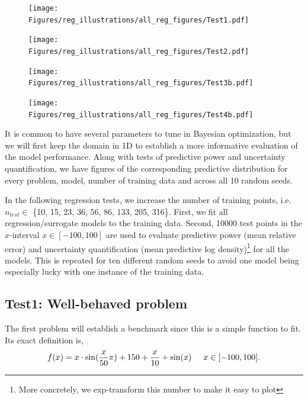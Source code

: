 \begin{figure}[h]
  \centering
  \begin{minipage}[b]{0.24\textwidth}
   \texttt{[image: Figures/reg\_illustrations/all\_reg\_figures/Test1.pdf]}
  \end{minipage}
  \hfill
  \begin{minipage}[b]{0.24\textwidth}
    \texttt{[image: Figures/reg\_illustrations/all\_reg\_figures/Test2.pdf]}
   \end{minipage}
   \hfill
   \begin{minipage}[b]{0.24\textwidth}
    \texttt{[image: Figures/reg\_illustrations/all\_reg\_figures/Test3b.pdf]}
   \end{minipage}
   \hfill
   \begin{minipage}[b]{0.24\textwidth}
     \texttt{[image: Figures/reg\_illustrations/all\_reg\_figures/Test4b.pdf]}
    \end{minipage}

  \label{TEST_problems}
\end{figure}

It is common to have several parameters to tune in Bayesian optimization, but we will first keep the
domain in 1D to establish a more informative evaluation of the model performance. Along with tests of predictive power and
uncertainty quantification, we have figures of the corresponding predictive distribution for every problem, 
model, number of training data and across all 10 random seeds. 

In the following regression tests, we increase the number of training points, i.e. $n_{test} \in$
\{10, 15, 23, 36, 56, 86, 133, 205, 316\}. First, we fit all regression/surrogate models to the
training data. Second, 10000 test points in the $x$-interval $x \in [-100,
100]$ are used to evaluate predictive power (mean relative error) and uncertainty quantification
(mean predictive log density)\footnote{More concretely, we exp-transform this number to make it
easy to plot} for all the models. This is repeated for ten different random seeds to avoid one model
being especially lucky with one instance of the training data. 


\subsection*{Test1: Well-behaved problem}
The first problem will establish a benchmark since this is a simple function to fit. Its exact definition is,
$$f(x) = x\cdot \sin(\frac{x}{50} \pi) + 150 + \frac{x}{10} + \sin(x) \hspace{0.5cm} x \in [-100,100].$$

